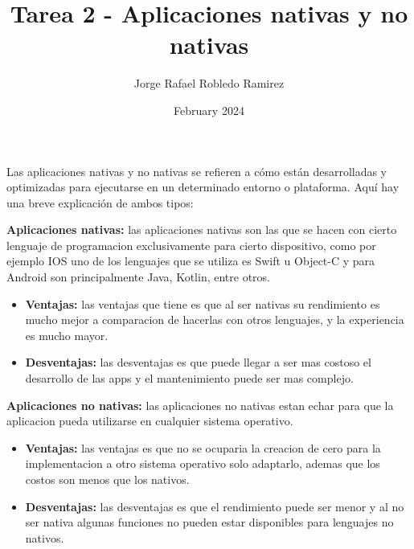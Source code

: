 \documentclass{article}
\title{Tarea 2 - Aplicaciones nativas y no nativas}
\author{Jorge Rafael Robledo Ramirez}
\date{February 2024}
\begin{document}
\maketitle Las aplicaciones nativas y no nativas se refieren a cómo están desarrolladas y optimizadas para ejecutarse en un determinado entorno o plataforma. Aquí hay una breve explicación de ambos tipos:

\textbf{Aplicaciones nativas:} las aplicaciones nativas son las que se hacen con cierto lenguaje de programacion exclusivamente para cierto dispositivo, como por ejemplo IOS uno de los lenguajes que se utiliza es Swift u Object-C y para Android son principalmente Java, Kotlin, entre otros.
  \begin{itemize}
    \item \textbf{Ventajas:} las ventajas que tiene es que al ser nativas su rendimiento es mucho mejor a comparacion de hacerlas con otros lenguajes, y la experiencia es mucho mayor.

    \item \textbf{Desventajas:} las desventajas es que puede llegar a ser mas costoso el desarrollo de las apps y el mantenimiento puede ser mas complejo.

  \end{itemize}

\textbf{Aplicaciones no nativas:} las aplicaciones no nativas estan echar para que la aplicacion pueda utilizarse en cualquier sistema operativo.

  \begin{itemize}
    \item \textbf{Ventajas:} las ventajas es que no se ocuparia la creacion de cero para la implementacion a otro sistema operativo solo adaptarlo, ademas que los costos son menos que los nativos.

    \item \textbf{Desventajas:} las desventajas es que el rendimiento puede ser menor y al no ser nativa algunas funciones no pueden estar disponibles para lenguajes no nativos.

  \end{itemize}
\end{document}

